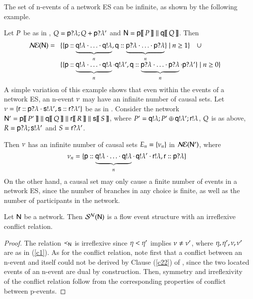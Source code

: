  The set of n-events of a network ES can be infinite, as  shown
 by  the following example. 
\begin{example}
Let  $P$ be as in , $Q={\sf p}?\lambda;Q +{\sf p}?\lambda'$ 
and ${\sf N}={\sf p}[\![\,P\,]\!] \mathrel{\|} {\sf q}[\![\,Q\,]\!]$. Then
$$ \mathcal{N\!E}({\sf N}) =
\begin{array}[t]{l}
 \{\{{\sf p}:: \underbrace{{\sf q}!\lambda\cdot\ldots\cdot{\sf q}!\lambda}_n,
{\sf q}:: \underbrace{{\sf p}?\lambda\cdot\ldots\cdot{\sf p}?\lambda}_n\}\mid
n\geq 1\} \quad \cup  \\[15pt]
\{\{{\sf p}:: \underbrace{{\sf q}!\lambda\cdot\ldots\cdot{\sf q}!\lambda}_n\cdot{\sf q}!\lambda',
{\sf q}:: \underbrace{{\sf p}?\lambda\cdot\ldots\cdot{\sf p}?\lambda}_n\cdot{\sf p}?\lambda'\}\mid
n\geq 0\} 
\end{array}
$$
 A simple variation of this example shows that even within the
events of a network ES, an n-event $\nu$ may have an infinite
number of causal sets. Let $\nu=\{{\sf r}:: {\sf p}?\lambda \cdot{\sf s}!
   \lambda',{\sf s}:: {\sf r}?\lambda'\}$ be as in .  
%
%
Consider the network $\Nt'=\pP{\pp}{\PP'} \parN \pP{\q}{\Q} \parN
\pP{\pr}{\R} \parN \pP{\ps}{S}$, where
$P'={\sf q}!\lambda;P'
\oplus{\sf q}!\lambda'; {\sf r}!\lambda$,
$Q$ %
is as above, $R = {\sf p}?\lambda;{\sf s}!\lambda'$ and
$S = {\sf r}?\lambda'$.

Then $\nu$ has an infinite number of causal sets $E_n =
\{\nu_n\}$ in $\mathcal{N\!E}({\sf N}')$, where
\[
\nu_n =
\{{\sf p}:: \underbrace{{\sf q}!\lambda\cdot\ldots\cdot{\sf q}!\lambda}_n
\cdot\,{\sf q}!\lambda'\cdot{\sf r}!\lambda,
{\sf r}:: {\sf p}?\lambda\}
\]
On the other hand, a causal set may only cause a finite number of
events in a network ES, since the number of branches in any choice is
finite, as well as the number of participants in the network.



\end{example}



%
\begin{theorem}
Let ${\sf N}$ be a  network. Then $\mathcal{S}^{\mathcal{N}}({\sf N})$ is a flow event
structure with an irreflexive conflict relation. 
\end{theorem}
\begin{proof}
  The relation  $\prec _{{\sf N}}$  is irreflexive since $ \eta < \eta'$
  implies $\nu\not=\nu'$, where $\eta,\eta ',\nu,
  \nu'$ are as in  (\ref{c1}).
  As for the conflict relation, note first that a conflict between an
  n-event and itself could not be derived by Clause (\ref{c22}) of
  , since the two located events of
  an n-event are dual by construction. Then,  symmetry and
  irreflexivity of the conflict relation follow from the corresponding
  properties of conflict between  p-events. 
\end{proof}

